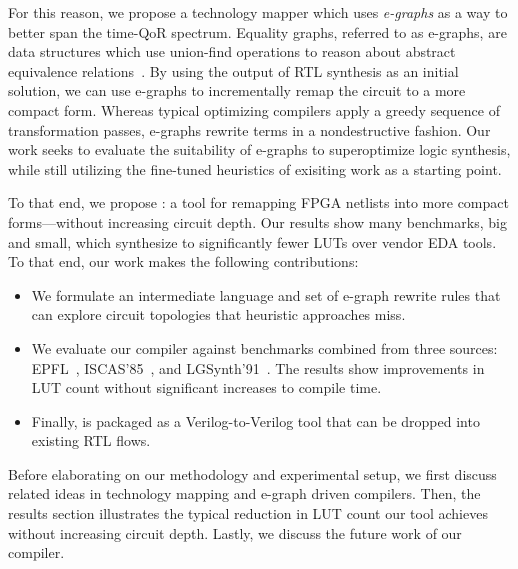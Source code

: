 For this reason, we propose a technology mapper which uses \textit{e-graphs} as
a way to better span the time-QoR spectrum. Equality graphs, referred to as
e-graphs, are data structures which use union-find operations to reason about
abstract equivalence relations~\cite{eggpaper}. By using the output of RTL
synthesis as an initial solution, we can use e-graphs to incrementally remap
the circuit to a more compact form. Whereas typical optimizing compilers apply
a greedy sequence of transformation passes, e-graphs rewrite terms in a
nondestructive fashion. Our work seeks to evaluate the suitability of e-graphs
to superoptimize logic synthesis, while still utilizing the fine-tuned
heuristics of exisiting work as a starting point.

To that end, we propose \shortname{}: a tool for remapping FPGA netlists into
more compact forms---without increasing circuit depth. Our results show many
benchmarks, big and small, which synthesize to significantly fewer LUTs over
vendor EDA tools. To that end, our work makes the following contributions:

\begin{itemize}
    \item We formulate an intermediate language and set of e-graph rewrite rules that can
          explore circuit topologies that heuristic approaches miss.
    \item We evaluate our compiler against \nbenchmarks{} benchmarks combined from three
          sources: EPFL~\cite{epflbench}, ISCAS'85~\cite{iscasbench}, and
          LGSynth'91~\cite{lgsynthbench}. The results show improvements in LUT count
          without significant increases to compile time.
    \item Finally, \shortname{} is packaged as a Verilog-to-Verilog tool that can be
          dropped into existing RTL flows.
\end{itemize}

Before elaborating on our methodology and experimental setup, we first discuss
related ideas in technology mapping and e-graph driven compilers. Then, the
results section illustrates the typical reduction in LUT count our tool
achieves without increasing circuit depth. Lastly, we discuss the future work
of our compiler.